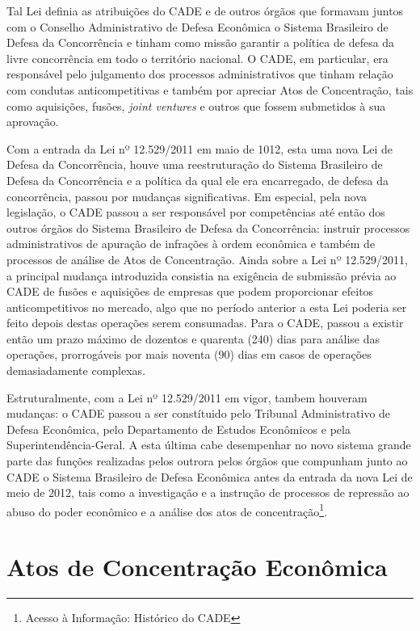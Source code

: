 \documentclass[11pt]{report}
\begin{document}
Tal Lei definia as atribuições do CADE e de outros órgãos que formavam juntos com o Conselho Administrativo de Defesa Econômica o Sistema Brasileiro de Defesa da Concorrência e tinham
como missão garantir a política de defesa da livre concorrência em todo o território nacional. O CADE, em particular, era responsável pelo julgamento dos processos administrativos
que tinham relação com condutas anticompetitivas e também por apreciar Atos de Concentração, tais como aquisições, fusões, \textit{joint ventures} e outros que fossem submetidos
à sua aprovação.

Com a entrada da Lei nº 12.529/2011 em maio de 1012, esta uma nova Lei de Defesa da Concorrência, houve uma reestruturação do Sistema Brasileiro de Defesa da Concorrência e a política
da qual ele era encarregado, de defesa da concorrência, passou por mudanças significativas. Em especial, pela nova legislação, o CADE passou a ser responsável por competências até
então dos outros órgãos do Sistema Brasileiro de Defesa da Concorrência: instruir processos administrativos de apuração de infrações à ordem econômica e também de processos de análise
de Atos de Concentração. Ainda sobre a Lei nº 12.529/2011, a principal mudança introduzida consistia na exigência de submissão
prévia ao CADE de fusões e aquisições de empresas que podem proporcionar efeitos anticompetitivos no mercado, algo que no período anterior a esta Lei poderia ser feito depois destas
operações serem consumadas. Para o CADE, passou a existir então um prazo máximo de dozentos e quarenta (240) dias para análise das operações, prorrogáveis por mais noventa (90) dias
em casos de operações demasiadamente complexas.

Estruturalmente, com a Lei nº 12.529/2011 em vigor, tambem houveram mudanças: o CADE passou a ser constítuido pelo Tribunal Administrativo de Defesa Econômica, pelo Departamento de
Estudos Econômicos e pela Superintendência-Geral. A esta última cabe desempenhar no novo sistema grande parte das funções realizadas pelos outrora pelos órgãos que compunham junto
ao CADE o Sistema Brasileiro de Defesa Econômica antes da entrada da nova Lei de meio de 2012, tais como a investigação e a instrução de processos de repressão ao abuso do poder
econômico e a análise dos atos de concentração\footnote[3]{Acesso à Informação: Histórico do CADE}.

\section{Atos de Concentração Econômica}
\end{document}
